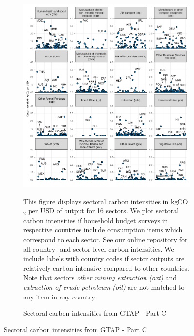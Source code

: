 \begin{figure}[ht!]\ContinuedFloat
\begin{subfigure}[b]{\textwidth}
  \centering
  \includegraphics{Analysis_Carbon_Intensities_GTAP/Figure_2.1.1_C_2017B.pdf}
  \caption{Sectoral carbon intensities from GTAP - Part C} \label{fig:B3}  
  \begin{subcaption2}
    This figure displays sectoral carbon intensities in kgCO$_{2}$ per USD of output for 16 sectors. We plot sectoral carbon intensities if household budget surveys in respective countries include consumption items which correspond to each sector. See our online repository for all country- and sector-level carbon intensities. We include labels with country codes if sector outputs are relatively carbon-intensive compared to other countries. Note that sectors \textit{other mining extraction (oxt)} and \textit{extraction of crude petroleum (oil)} are not matched to any item in any country.
  \end{subcaption2}
\end{subfigure}
\end{figure}

\clearpage

